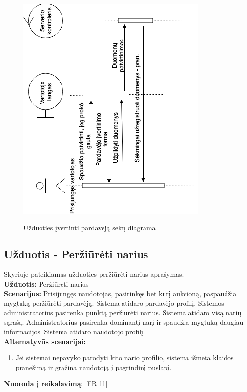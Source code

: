 \documentclass{VUMIFPSkursinis}
\begin{document}
			\begin{figure}[H]
		\centering
		\includegraphics[width=\linewidth]{img/evaluateSellerSequence.png}
		\label{fig:ivertinimas}
		\caption{Užduoties įvertinti pardavėją sekų diagrama}
	\end{figure}

	\subsection{Užduotis - Peržiūrėti narius}
	Skyriuje pateikiamas užduoties peržiūrėti narius aprašymas.\\
	\textbf{Užduotis:}  Peržiūrėti narius \\
	\textbf{Scenarijus:}  Prisijungęs naudotojas, pasirinkęs bet kurį aukcioną, paspaudžia mygtuką peržiūrėti pardavėją. Sistema atidaro pardavėjo profilį. Sistemos administratorius pasirenka punktą peržiūrėti narius. Sistema atidaro visą narių sąrašą. Administratorius pasirenka dominantį narį ir spaudžia mygtuką daugiau informacijos. Sistema atidaro naudotojo profilį. \\
	\textbf{Alternatyvūs scenarijai:}
	\begin{enumerate}
		\item Jei sistemai nepavyko parodyti kito nario profilio, sistema išmeta klaidos pranešimą ir grąžina naudotoją į pagrindinį puslapį.
	\end{enumerate}
	\textbf{Nuoroda į reikalavimą: } [FR 11]
	
\end{document}

